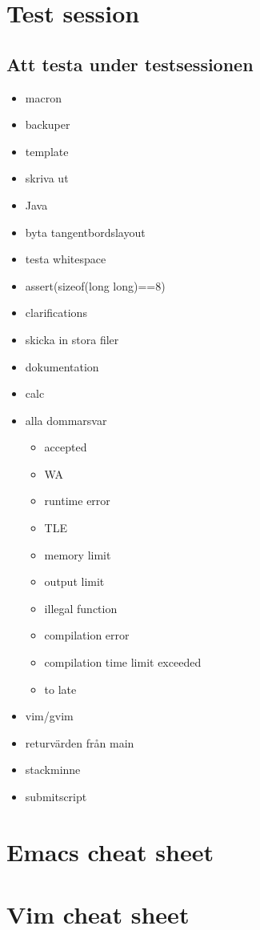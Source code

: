 
\appendix

\chapter{Test session}

\section{Att testa under testsessionen}
\begin{itemize}
	\item macron
	\item backuper
	\item template
	\item skriva ut
	\item Java
	\item byta tangentbordslayout
	\item testa whitespace
	\item assert(sizeof(long long)==8)
	\item clarifications
	\item skicka in stora filer
	\item dokumentation
	\item calc
	\item alla dommarsvar
	\begin{itemize}
 			\item accepted
 			\item WA
 			\item runtime error
 			\item TLE
 			\item memory limit
 			\item output limit
 			\item illegal function
 			\item compilation error
 			\item compilation time limit exceeded
 			\item to late
		\end{itemize}
	\item vim/gvim
	\item returvärden från main
	\item stackminne
	\item submitscript
\end{itemize}

\chapter{Emacs cheat sheet}

\chapter{Vim cheat sheet}
